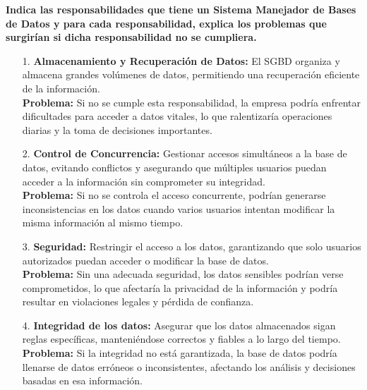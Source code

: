 \begin{center}   
\textbf{Indica las responsabilidades que tiene un Sistema Manejador de Bases de Datos y para cada responsabilidad, explica los problemas que surgirían si dicha responsabilidad no se cumpliera.}\\
\end{center}

\begin{enumerate}
    \item[1.] \textbf{Almacenamiento y Recuperación de Datos:}
    El SGBD organiza y almacena grandes volúmenes de datos, permitiendo una recuperación eficiente de la información.\\
    \textbf{Problema:} Si no se cumple esta responsabilidad, la empresa podría enfrentar dificultades para acceder a datos vitales, lo que ralentizaría operaciones diarias y la toma de decisiones importantes. \cite{Uni-Europea} \\
             
    \item[2.] \textbf{Control de Concurrencia:}
     Gestionar accesos simultáneos a la base de datos, evitando conflictos y asegurando que múltiples usuarios puedan acceder a la información sin comprometer su integridad.\\
     \textbf{Problema:} Si no se controla el acceso concurrente, podrían generarse inconsistencias en los datos cuando varios usuarios intentan modificar la misma información al mismo tiempo. \\

    \item[3.] \textbf{Seguridad:}
    Restringir el acceso a los datos, garantizando que solo usuarios autorizados puedan acceder o modificar la base de datos.\\
    \textbf{Problema:} Sin una adecuada seguridad, los datos sensibles podrían verse comprometidos, lo que afectaría la privacidad de la información y podría resultar en violaciones legales y pérdida de confianza. \\

    \item[4.] \textbf{Integridad de los datos:}
    Asegurar que los datos almacenados sigan reglas específicas, manteniéndose correctos y fiables a lo largo del tiempo.\\
    \textbf{Problema:} Si la integridad no está garantizada, la base de datos podría llenarse de datos erróneos o inconsistentes, afectando los análisis y decisiones basadas en esa información. \\


\end{enumerate}
